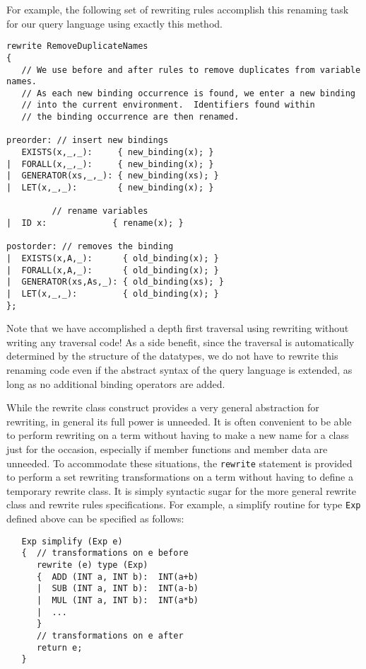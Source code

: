 For example, the following set of rewriting rules accomplish this renaming
task for our query language using exactly this method.  
\begin{verbatim}
rewrite RemoveDuplicateNames
{
   // We use before and after rules to remove duplicates from variable names.
   // As each new binding occurrence is found, we enter a new binding
   // into the current environment.  Identifiers found within
   // the binding occurrence are then renamed.

preorder: // insert new bindings
   EXISTS(x,_,_):     { new_binding(x); }
|  FORALL(x,_,_):     { new_binding(x); }
|  GENERATOR(xs,_,_): { new_binding(xs); }
|  LET(x,_,_):        { new_binding(x); }

         // rename variables
|  ID x:             { rename(x); }

postorder: // removes the binding
|  EXISTS(x,A,_):      { old_binding(x); }
|  FORALL(x,A,_):      { old_binding(x); }
|  GENERATOR(xs,As,_): { old_binding(xs); }
|  LET(x,_,_):         { old_binding(x); }
};
\end{verbatim}

Note that we have accomplished a depth first traversal using rewriting
without writing any traversal code!  As a side benefit, 
since the traversal is automatically determined by 
the structure of the datatypes, we do not have to rewrite this
renaming code even if the abstract syntax of the query language is
extended, as long as no additional binding operators are added.

 
   While the rewrite class construct provides a very general abstraction
for rewriting, in general its full power is unneeded.  It is often
convenient to be able to perform rewriting on a term without having
to make a new name for a class just for the occasion, especially if member
functions and member data are unneeded.  To accommodate these situations,
the \verb|rewrite| statement is provided
to perform a set rewriting transformations on a term without having
to define a temporary rewrite class.   It is simply syntactic sugar
for the more general rewrite class and rewrite
rules specifications.
For example, a simplify routine for type \verb|Exp| defined above can be
specified as follows:
 
\begin{verbatim}
   Exp simplify (Exp e)
   {  // transformations on e before
      rewrite (e) type (Exp)
      {  ADD (INT a, INT b):  INT(a+b)
      |  SUB (INT a, INT b):  INT(a-b)
      |  MUL (INT a, INT b):  INT(a*b)
      |  ...
      }
      // transformations on e after
      return e;
   }
\end{verbatim}
 
